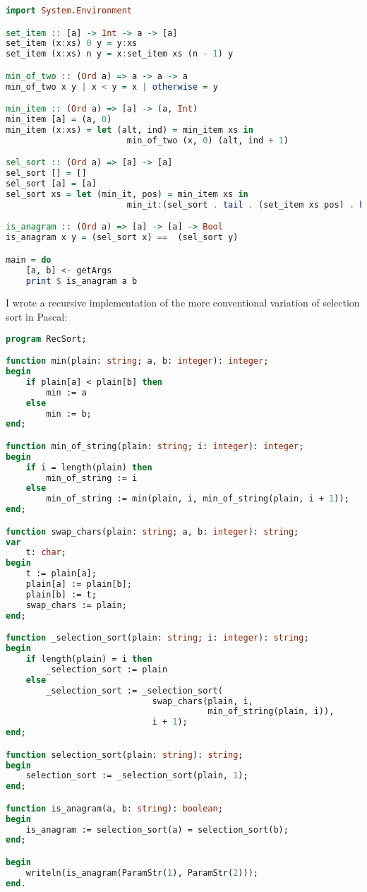 \documentclass[fleqn,a4paper,11pt]{article}
\begin{document}
\begin{lstlisting}[language=Haskell, caption=Selection sort in Haskell]
import System.Environment

set_item :: [a] -> Int -> a -> [a]
set_item (x:xs) 0 y = y:xs
set_item (x:xs) n y = x:set_item xs (n - 1) y

min_of_two :: (Ord a) => a -> a -> a
min_of_two x y | x < y = x | otherwise = y

min_item :: (Ord a) => [a] -> (a, Int)
min_item [a] = (a, 0)
min_item (x:xs) = let (alt, ind) = min_item xs in
                        min_of_two (x, 0) (alt, ind + 1)

sel_sort :: (Ord a) => [a] -> [a]
sel_sort [] = []
sel_sort [a] = [a]
sel_sort xs = let (min_it, pos) = min_item xs in
                        min_it:(sel_sort . tail . (set_item xs pos) . head) xs

is_anagram :: (Ord a) => [a] -> [a] -> Bool
is_anagram x y = (sel_sort x) ==  (sel_sort y)

main = do
    [a, b] <- getArgs
    print $ is_anagram a b
\end{lstlisting}
\iffalse $ \fi %

    I wrote a recursive implementation of the more conventional variation of
    selection sort in Pascal:

\begin{lstlisting}[language=Pascal, caption=Recursive selection sort in Pascal]
program RecSort;

function min(plain: string; a, b: integer): integer;
begin
    if plain[a] < plain[b] then
        min := a
    else
        min := b;
end;

function min_of_string(plain: string; i: integer): integer;
begin
    if i = length(plain) then
        min_of_string := i
    else
        min_of_string := min(plain, i, min_of_string(plain, i + 1));
end;

function swap_chars(plain: string; a, b: integer): string;
var
    t: char;
begin
    t := plain[a];
    plain[a] := plain[b];
    plain[b] := t;
    swap_chars := plain;
end;

function _selection_sort(plain: string; i: integer): string;
begin
    if length(plain) = i then
        _selection_sort := plain
    else
        _selection_sort := _selection_sort(
                             swap_chars(plain, i,
                                        min_of_string(plain, i)),
                             i + 1);
end;

function selection_sort(plain: string): string;
begin
    selection_sort := _selection_sort(plain, 1);
end;

function is_anagram(a, b: string): boolean;
begin
    is_anagram := selection_sort(a) = selection_sort(b);
end;

begin
    writeln(is_anagram(ParamStr(1), ParamStr(2)));
end.
\end{lstlisting}
\end{document}
